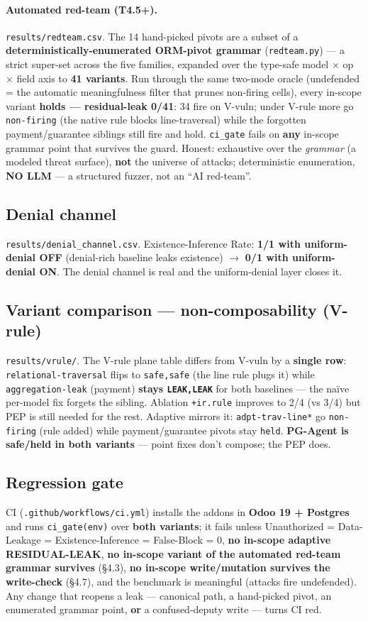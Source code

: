 \documentclass[11pt,a4paper]{article}
\newcommand{\code}[1]{\texttt{#1}}
\begin{document}
\paragraph{Automated red-team (T4.5+).} \code{results/redteam.csv}. The 14 hand-picked pivots are a subset of a
\textbf{deterministically-enumerated ORM-pivot grammar} (\code{redteam.py}) --- a strict super-set across the
five families, expanded over the type-safe model $\times$ op $\times$ field axis to \textbf{41 variants}. Run
through the same two-mode oracle (undefended = the automatic meaningfulness filter that prunes non-firing
cells), every in-scope variant \textbf{holds --- residual-leak 0/41}: 34 fire on V-vuln; under V-rule more go
\code{non-firing} (the native rule blocks line-traversal) while the forgotten payment/guarantee siblings still
fire and hold. \code{ci_gate} fails on \textbf{any} in-scope grammar point that survives the guard. Honest:
exhaustive over the \emph{grammar} (a modeled threat surface), \textbf{not} the universe of attacks;
deterministic enumeration, \textbf{NO LLM} --- a structured fuzzer, not an ``AI red-team''.

\subsection{Denial channel}
\code{results/denial_channel.csv}. Existence-Inference Rate: \textbf{1/1 with uniform-denial OFF}
(denial-rich baseline leaks existence) $\to$ \textbf{0/1 with uniform-denial ON}. The denial channel is real
and the uniform-denial layer closes it.

\subsection{Variant comparison --- non-composability (V-rule)}
\code{results/vrule/}. The V-rule plane table differs from V-vuln by a \textbf{single row}:
\code{relational-traversal} flips to \code{safe,safe} (the line rule plugs it) while \code{aggregation-leak}
(payment) \textbf{stays \code{LEAK,LEAK}} for both baselines --- the na\"ive per-model fix forgets the sibling.
Ablation \code{+ir.rule} improves to 2/4 (vs 3/4) but PEP is still needed for the rest. Adaptive mirrors it:
\code{adpt-trav-line*} go \code{non-firing} (rule added) while payment/guarantee pivots stay \code{held}.
\textbf{PG-Agent is safe/held in both variants} --- point fixes don't compose; the PEP does.

\subsection{Regression gate}
CI (\code{.github/workflows/ci.yml}) installs the addons in \textbf{Odoo 19 + Postgres} and runs
\code{ci_gate(env)} over \textbf{both variants}; it fails unless Unauthorized = Data-Leakage =
Existence-Inference = False-Block = 0, \textbf{no in-scope adaptive RESIDUAL-LEAK}, \textbf{no in-scope variant
of the automated red-team grammar survives} (\S4.3), \textbf{no in-scope write/mutation survives the write-check}
(\S4.7), and the benchmark is meaningful (attacks fire undefended). Any change that reopens a leak --- canonical
path, a hand-picked pivot, an enumerated grammar point, \textbf{or} a confused-deputy write --- turns CI red.
\end{document}
